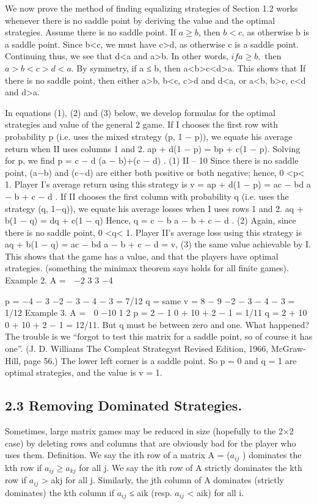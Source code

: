 \documentclass[]{report}
\begin{document}
We now prove the method of finding equalizing strategies of Section 1.2 works whenever
there is no saddle point by deriving the value and the optimal strategies.
Assume there is no saddle point. If $a \geq b$, then $b<c$, as otherwise b is a saddle point.
Since b<c, we must have c>d, as otherwise c is a saddle point. Continuing thus, we see
that d<a and a>b. In other words, $if a \geq b,$ then $a>b < c > d <a$. By symmetry, if
a ≤ b, then a<b>c<d>a. This shows that
If there is no saddle point, then either a>b, b<c, c>d and d<a, or a<b, b>c,
c<d and d>a.

In equations (1), (2) and (3) below, we develop formulas for the optimal strategies
and value of the general 2  game. If I chooses the first row with probability p (i.e. uses
the mixed strategy (p, 1 − p)), we equate his average return when II uses columns 1 and 2.
ap + d(1 − p) = bp + c(1 − p).
Solving for p, we find
p = c − d
(a − b)+(c − d)
. (1)
II – 10
Since there is no saddle point, (a−b) and (c−d) are either both positive or both negative;
hence, 0 <p< 1. Player I’s average return using this strategy is
v = ap + d(1 − p) = ac − bd
a − b + c − d
.
If II chooses the first column with probability q (i.e. uses the strategy (q, 1−q)), we equate
his average losses when I uses rows 1 and 2.
aq + b(1 − q) = dq + c(1 − q)
Hence,
q = c − b
a − b + c − d
. (2)
Again, since there is no saddle point, 0 <q< 1. Player II’s average loss using this strategy
is
aq + b(1 − q) = ac − bd
a − b + c − d = v, (3)
the same value achievable by I. This shows that the game has a value, and that the players
have optimal strategies. (something the minimax theorem says holds for all finite games).
Example 2.
A =
 −2 3
3 −4

p = −4 − 3
−2 − 3 − 4 − 3 = 7/12
q = same
v = 8 − 9
−2 − 3 − 4 − 3
= 1/12
Example 3.
A =
 0 −10
1 2  p = 2 − 1
0 + 10 + 2 − 1
= 1/11
q = 2 + 10
0 + 10 + 2 − 1
= 12/11.
But q must be between zero and one. What happened? The trouble is we “forgot to test
this matrix for a saddle point, so of course it has one”. (J. D. Williams The Compleat
Strategyst Revised Edition, 1966, McGraw-Hill, page 56.) The lower left corner is a saddle
point. So p = 0 and q = 1 are optimal strategies, and the value is v = 1.
\subsection{2.3 Removing Dominated Strategies.} Sometimes, large matrix games may be
reduced in size (hopefully to the 2×2 case) by deleting rows and columns that are obviously
bad for the player who uses them.
Definition. We say the ith row of a matrix A = ($ a_{ij}$  ) dominates the kth row if
$ a_{ij}  \geq a_{kj}$ for all j. We say the ith row of A strictly dominates the kth row if $ a_{ij}$  > akj
for all j. Similarly, the jth column of A dominates (strictly dominates) the kth column if
$ a_{ij}$  ≤ aik (resp. $ a_{ij}$  < aik) for all i.
\end{document}
